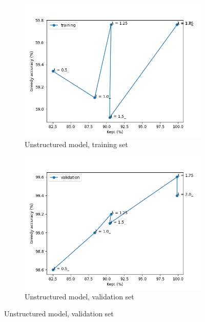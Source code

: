 \begin{figure}
    \centering
    \begin{subfigure}[b]{0.47\textwidth}
        \centering
        \includegraphics[width=1.1\textwidth]{figs/unstructured_acc_cost_train.png}
        \caption{Unstructured model, training set}
        \label{fig:unstr_train}
    \end{subfigure}
    \hfill
    \begin{subfigure}[b]{0.47\textwidth}
        \centering
        \includegraphics[width=1.1\textwidth]{figs/unstructured_acc_cost_val.png}
        \caption{Unstructured model, validation set}
        \label{fig:unstr_val}
    \end{subfigure}
    \hfill

\end{figure}

